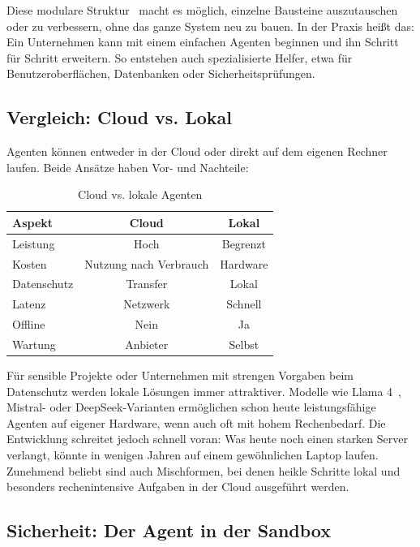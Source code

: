 Diese modulare Struktur~\cite{wu2023autogen} macht es möglich, einzelne Bausteine auszutauschen oder zu verbessern, ohne das ganze System neu zu bauen. In der Praxis heißt das: Ein Unternehmen kann mit einem einfachen Agenten beginnen und ihn Schritt für Schritt erweitern. So entstehen auch spezialisierte Helfer, etwa für Benutzeroberflächen, Datenbanken oder Sicherheitsprüfungen.

\subsection{Vergleich: Cloud vs. Lokal}

Agenten können entweder in der Cloud oder direkt auf dem eigenen Rechner laufen. Beide Ansätze haben Vor- und Nachteile:

\begin{table}[ht]
\centering
\footnotesize
\begin{tabularx}{\columnwidth}{@{}Y c c@{}}
\toprule
\textbf{Aspekt} & \textbf{Cloud} & \textbf{Lokal} \\
\midrule
Leistung & Hoch & Begrenzt \\
Kosten & Nutzung nach Verbrauch & Hardware \\
Datenschutz & Transfer & Lokal \\
Latenz & Netzwerk & Schnell \\
Offline & Nein & Ja \\
Wartung & Anbieter & Selbst \\
\bottomrule
\end{tabularx}
\caption{Cloud vs. lokale Agenten}
\label{tab:cloudlokal}
\end{table}

Für sensible Projekte oder Unternehmen mit strengen Vorgaben beim Datenschutz werden lokale Lösungen immer attraktiver. Modelle wie Llama 4~\cite{meta2025llama4}, Mistral- oder DeepSeek-Varianten ermöglichen schon heute leistungsfähige Agenten auf eigener Hardware, wenn auch oft mit hohem Rechenbedarf. Die Entwicklung schreitet jedoch schnell voran: Was heute noch einen starken Server verlangt, könnte in wenigen Jahren auf einem gewöhnlichen Laptop laufen. Zunehmend beliebt sind auch Mischformen, bei denen heikle Schritte lokal und besonders rechenintensive Aufgaben in der Cloud ausgeführt werden.

\subsection{Sicherheit: Der Agent in der Sandbox}

